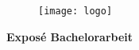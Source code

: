 \begin{titlepage}

\begingroup
\begin{figure}[h!]
    \centering
	\texttt{[image: logo]}
\end{figure}
\let\newpage\relax%
\center\huge{\textbf{Expos\'{e} Bachelorarbeit}}
\maketitle
\endgroup

\end{titlepage}


\tableofcontents
\listoffigures